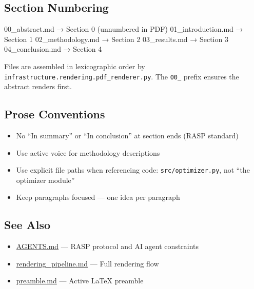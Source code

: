 \documentclass[
]{article}
\newenvironment{Shaded}{}{}
\newcommand{\NormalTok}[1]{#1}
\providecommand{\tightlist}{%
  \setlength{\itemsep}{0pt}\setlength{\parskip}{0pt}}
\begin{document}
\subsection{Section Numbering}\label{section-numbering}

\begin{Shaded}
\begin{Highlighting}[]
\NormalTok{00\_abstract.md    → Section 0 (unnumbered in PDF)}
\NormalTok{01\_introduction.md → Section 1}
\NormalTok{02\_methodology.md  → Section 2}
\NormalTok{03\_results.md      → Section 3}
\NormalTok{04\_conclusion.md   → Section 4}
\end{Highlighting}
\end{Shaded}

Files are assembled in lexicographic order by
\texttt{infrastructure.rendering.pdf\_renderer.py}. The \texttt{00\_}
prefix ensures the abstract renders first.

\subsection{Prose Conventions}\label{prose-conventions}

\begin{itemize}
\tightlist
\item
  No ``In summary'' or ``In conclusion'' at section ends (RASP standard)
\item
  Use active voice for methodology descriptions
\item
  Use explicit file paths when referencing code:
  \texttt{src/optimizer.py}, not ``the optimizer module''
\item
  Keep paragraphs focused --- one idea per paragraph
\end{itemize}

\subsection{See Also}\label{see-also}

\begin{itemize}
\tightlist
\item
  \url{AGENTS.md} --- RASP protocol and AI agent constraints
\item
  \href{../docs/rendering_pipeline.md}{rendering\_pipeline.md} --- Full
  rendering flow
\item
  \url{preamble.md} --- Active LaTeX preamble
\end{itemize}



\clearpage


\end{document}
